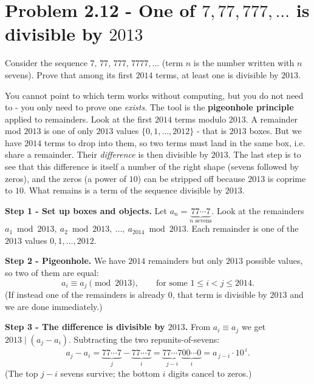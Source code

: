 \documentclass[11pt,a4paper]{article}
\begin{document}
\section*{Problem 2.12 - One of $7,77,777,\dots$ is divisible by $2013$}

\begin{problembox}[2.12]
Consider the sequence $7,\,77,\,777,\,7777,\dots$ (term $n$ is the number written with $n$
sevens). Prove that among its first $2014$ terms, at least one is divisible by $2013$.
\end{problembox}

\begin{ideabox}
You cannot point to which term works without computing, but you do not need to - you only need to
prove one \emph{exists}. The tool is the \textbf{pigeonhole principle} applied to remainders. Look
at the first $2014$ terms modulo $2013$. A remainder mod $2013$ is one of only $2013$ values
$\{0,1,\dots,2012\}$ - that is $2013$ \textquotedbl{}boxes\textquotedbl{}. But we have $2014$ terms
to drop into them, so two terms must land in the same box, i.e. share a remainder. Their
\emph{difference} is then divisible by $2013$. The last step is to see that this difference is
itself a number of the right shape (sevens followed by zeros), and the zeros (a power of $10$) can
be stripped off because $2013$ is coprime to $10$. What remains is a term of the sequence divisible
by $2013$.
\end{ideabox}

\textbf{Step 1 - Set up boxes and objects.}
Let $a_n = \underbrace{77\cdots7}_{n\text{ sevens}}$. Look at the remainders
$a_1 \bmod 2013,\ a_2\bmod 2013,\ \dots,\ a_{2014}\bmod 2013$. Each remainder is one of the
$2013$ values $0,1,\dots,2012$.

\textbf{Step 2 - Pigeonhole.}
We have $2014$ remainders but only $2013$ possible values, so two of them are equal:
\[
a_i \equiv a_j \pmod{2013},\qquad \text{for some } 1\le i < j \le 2014 .
\]
(If instead one of the remainders is already $0$, that term is divisible by $2013$ and we are
done immediately.)

\textbf{Step 3 - The difference is divisible by $2013$.}
From $a_i\equiv a_j$ we get $2013 \mid (a_j - a_i)$. Subtracting the two repunits-of-sevens:
\[
a_j - a_i = \underbrace{77\cdots7}_{j} - \underbrace{77\cdots7}_{i}
= \underbrace{77\cdots7}_{\,j-i\,}\underbrace{00\cdots0}_{\,i\,}
= a_{\,j-i}\cdot 10^{\,i}.
\]
(The top $j-i$ sevens survive; the bottom $i$ digits cancel to zeros.)
\end{document}
